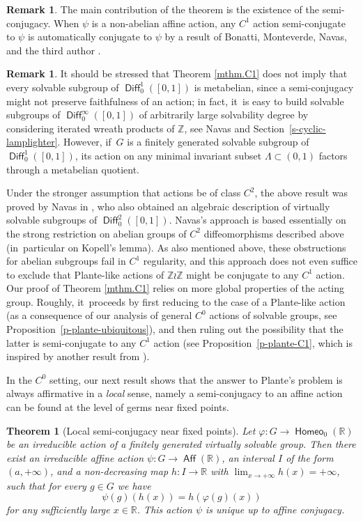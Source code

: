 \documentclass[JEP,XML,SOM,Unicode,NoFloatCountersInSection,published]{cedram}
\newtheorem{introthm}{Theorem}
\theoremstyle{definition}
\newtheorem{rem}[thm]{Remark}
\DeclareMathOperator{\Aff}{\mathsf{Aff}}
\DeclareMathOperator{\Diff}{\mathsf{Diff}}
\DeclareMathOperator{\homeo}{\mathsf{Homeo}}
\newcommand{\R}{\mathbb{R}}
\newcommand{\Z}{\mathbb Z}
\begin{document}
\begin{rem}
The main contribution of the theorem is the existence of the semi-conjugacy. When $\psi$ is a non-abelian affine action, any $C^1$ action semi-conjugate to $\psi$ is automatically conjugate to $\psi$ by a result of Bonatti, Monteverde, Navas, and the third author \cite[\S 4.2]{BMNR}.
\end{rem}

\begin{rem}
It should be stressed that Theorem \ref{mthm.C1} does not imply that every solvable subgroup of $\Diff^1_0([0, 1])$ is metabelian, since a semi-conjugacy might not preserve faithfulness of an action; in fact, it~is easy to build solvable subgroups of $\Diff^\infty_0([0, 1])$ of arbitrarily large solvability degree by considering iterated wreath products of $\Z$, see Navas \cite{NavasResolubles} and Section~\ref{s-cyclic-lamplighter}. However, if~$G$ is a finitely generated solvable subgroup of $\Diff^1_0([0, 1])$, its action on any minimal invariant subset $\Lambda\subset (0, 1)$ factors through a metabelian quotient.\end{rem}

Under the stronger assumption that actions be of class $C^2$, the above result was proved by Navas in \cite{NavasResolubles,NavasAmenable}, who also obtained an algebraic description of virtually solvable subgroups of $\Diff^2_0([0, 1])$. Navas's approach is based essentially on the strong restriction on abelian groups of $C^2$ diffeomorphisms described above (in~particular on Kopell's lemma). As also mentioned above, these obstructions for abelian subgroups fail in $C^1$ regularity, and this approach does not even suffice to exclude that Plante-like actions of $\Z \wr \Z$ might be conjugate to any $C^1$ action. Our proof of Theorem \ref{mthm.C1} relies on more global properties of the acting group. Roughly, it~proceeds by first reducing to the case of a Plante-like action (as a consequence of our analysis of general $C^0$ actions of solvable groups, see Proposition~\ref{p-plante-ubiquitous}), and then ruling out the possibility that the latter is semi-conjugate to any $C^1$ action (see Proposition~\ref{p-plante-C1}, which is inspired by another result from \cite{BMNR}).

In the $C^0$ setting, our next result shows that the answer to Plante's problem is always affirmative in a \emph{local} sense, namely a semi-conjugacy to an affine action can be found at the level of germs near fixed points.

\begin{introthm}[Local semi-conjugacy near fixed points]\label{mthm.affine_trace}
Let $\varphi\colon G\to \homeo_0(\R)$ be an irreducible action of a finitely generated virtually solvable group.
Then there exist an irreducible affine action $\psi\colon G\to \Aff(\R)$, an interval $I$ of the form $(a,+\infty)$, and a non-decreasing map $h\colon I\to \R$ with $\lim_{x\to +\infty} h(x)=+\infty$, such that for every $g\in G$ we have
\[\psi(g)(h(x))= h(\varphi(g)(x))
\]
for any sufficiently large $x\in \R$. This action $\psi$ is unique up to affine conjugacy.
\end{introthm}
\end{document}
